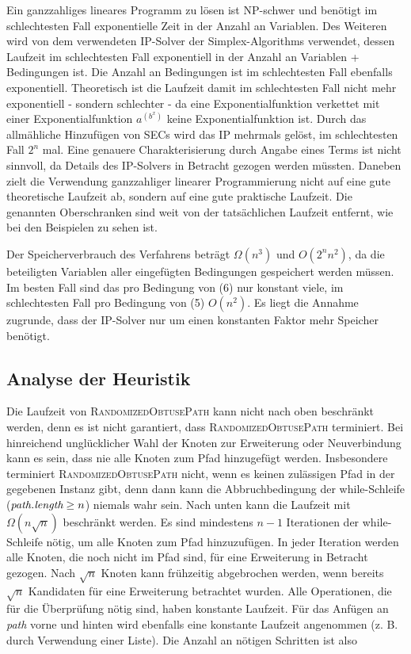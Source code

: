 \documentclass[a4paper, 10pt, ngerman]{article}
\begin{document}
Ein ganzzahliges lineares Programm zu lösen ist NP-schwer und benötigt im schlechtesten Fall exponentielle Zeit in der Anzahl an Variablen. Des Weiteren wird von dem verwendeten IP-Solver der Simplex-Algorithms verwendet, dessen Laufzeit im schlechtesten Fall exponentiell in der Anzahl an Variablen + Bedingungen ist. Die Anzahl an Bedingungen ist im schlechtesten Fall ebenfalls exponentiell. Theoretisch ist die Laufzeit damit im schlechtesten Fall nicht mehr exponentiell - sondern schlechter - da eine Exponentialfunktion verkettet mit einer Exponentialfunktion $a^{(b^x)}$ keine Exponentialfunktion ist. Durch das allmähliche Hinzufügen von SECs wird das IP mehrmals gelöst, im schlechtesten Fall $2^n$ mal. Eine genauere Charakterisierung durch Angabe eines Terms ist nicht sinnvoll, da Details des IP-Solvers in Betracht gezogen werden müssten. Daneben zielt die Verwendung ganzzahliger linearer Programmierung nicht auf eine gute theoretische Laufzeit ab, sondern auf eine gute praktische Laufzeit. Die genannten Oberschranken sind weit von der tatsächlichen Laufzeit entfernt, wie bei den Beispielen zu sehen ist. 

Der Speicherverbrauch des Verfahrens beträgt $\Omega(n^3)$ und $O(2^n n^2)$, da die beteiligten Variablen aller eingefügten Bedingungen gespeichert werden müssen. Im besten Fall sind das pro Bedingung von (6) nur konstant viele, im schlechtesten Fall pro Bedingung von (5) $O(n^2)$. Es liegt die Annahme zugrunde, dass der IP-Solver nur um einen konstanten Faktor mehr Speicher benötigt.

\subsection{Analyse der Heuristik}

Die Laufzeit von \textsc{RandomizedObtusePath} kann nicht nach oben beschränkt werden, denn es ist nicht garantiert, dass \textsc{RandomizedObtusePath} terminiert. Bei hinreichend unglücklicher Wahl der Knoten zur Erweiterung oder Neuverbindung kann es sein, dass nie alle Knoten zum Pfad hinzugefügt werden. Insbesondere terminiert \textsc{RandomizedObtusePath} nicht, wenn es keinen zulässigen Pfad in der gegebenen Instanz gibt, denn dann kann die Abbruchbedingung der while-Schleife ($\emph{path.length} \ge n$) niemals wahr sein. Nach unten kann die Laufzeit mit $\Omega(n \sqrt n)$ beschränkt werden. Es sind mindestens $n - 1$ Iterationen der while-Schleife nötig, um alle Knoten zum Pfad hinzuzufügen. In jeder Iteration werden alle Knoten, die noch nicht im Pfad sind, für eine Erweiterung in Betracht gezogen. Nach $\sqrt n$ Knoten kann frühzeitig abgebrochen werden, wenn bereits $\sqrt n$ Kandidaten für eine Erweiterung betrachtet wurden. Alle Operationen, die für die Überprüfung nötig sind, haben konstante Laufzeit. Für das Anfügen an \emph{path} vorne und hinten wird ebenfalls eine konstante Laufzeit angenommen (z. B. durch Verwendung einer Liste). Die Anzahl an nötigen Schritten ist also
\end{document}
